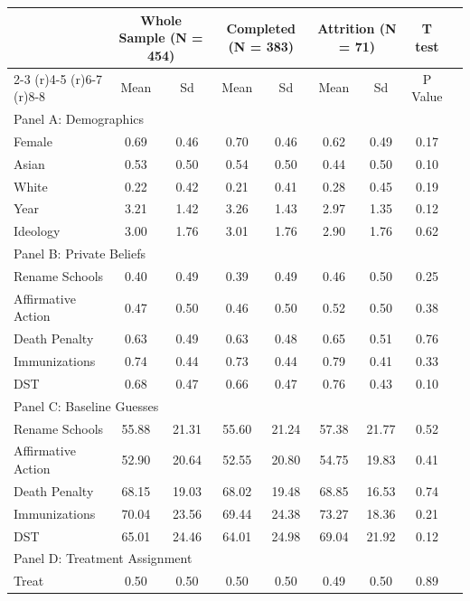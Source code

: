 \begin{tabular}{l*{8}c}\toprule & \multicolumn{2}{c}{\textbf{Whole Sample (N = 454)}} & \multicolumn{2}{c}{\textbf{Completed (N = 383)}}  & \multicolumn{2}{c}{\textbf{Attrition (N = 71)}} & \multicolumn{1}{c}{\textbf{T test}} \\\cmidrule(r){2-3} \cmidrule(r){4-5} \cmidrule(r){6-7}  \cmidrule(r){8-8}  & Mean & Sd & Mean & Sd & Mean & Sd & P Value \\ \midrule \multicolumn{7}{l}{Panel A: Demographics} \\\midrule Female&    0.69&    0.46&    0.70&    0.46&    0.62&    0.49&    0.17\\Asian&    0.53&    0.50&    0.54&    0.50&    0.44&    0.50&    0.10\\White&    0.22&    0.42&    0.21&    0.41&    0.28&    0.45&    0.19\\Year&    3.21&    1.42&    3.26&    1.43&    2.97&    1.35&    0.12\\Ideology&    3.00&    1.76&    3.01&    1.76&    2.90&    1.76&    0.62\\\midrule \multicolumn{7}{l}{Panel B: Private Beliefs} \\\midrule Rename Schools&    0.40&    0.49&    0.39&    0.49&    0.46&    0.50&    0.25\\Affirmative Action&    0.47&    0.50&    0.46&    0.50&    0.52&    0.50&    0.38\\Death Penalty&    0.63&    0.49&    0.63&    0.48&    0.65&    0.51&    0.76\\Immunizations&    0.74&    0.44&    0.73&    0.44&    0.79&    0.41&    0.33\\DST&    0.68&    0.47&    0.66&    0.47&    0.76&    0.43&    0.10\\\midrule \multicolumn{7}{l}{Panel C: Baseline Guesses} \\\midrule Rename Schools&   55.88&   21.31&   55.60&   21.24&   57.38&   21.77&    0.52\\Affirmative Action&   52.90&   20.64&   52.55&   20.80&   54.75&   19.83&    0.41\\Death Penalty&   68.15&   19.03&   68.02&   19.48&   68.85&   16.53&    0.74\\Immunizations&   70.04&   23.56&   69.44&   24.38&   73.27&   18.36&    0.21\\DST&   65.01&   24.46&   64.01&   24.98&   69.04&   21.92&    0.12\\\midrule \multicolumn{7}{l}{Panel D: Treatment Assignment} \\\midrule Treat&    0.50&    0.50&    0.50&    0.50&    0.49&    0.50&    0.89\\\bottomrule \end{tabular} 